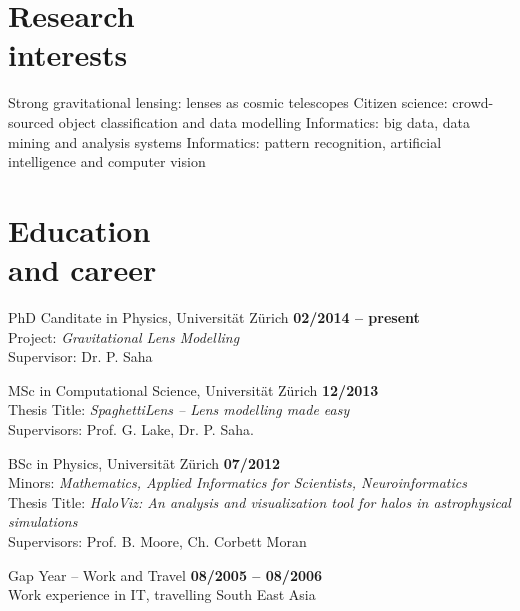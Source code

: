 \documentclass[margin,line]{resume}
\def\tb{\textbullet\;}
\begin{document}
\begin{resume}
\section{\mysidestyle Research\\interests}

  \tb Strong gravitational lensing: lenses as cosmic telescopes
  \tb Citizen science: crowd-sourced object classification and data modelling
  \tb Informatics: big data, data mining and analysis systems
  \tb Informatics: pattern recognition, artificial intelligence and computer vision


\section{\mysidestyle Education\\ and career}

\begin{list2}

  \item  PhD Canditate in Physics, Universität Zürich
  \hfill {\bf 02/2014 -- present}\\
  {\small Project: \emph{Gravitational Lens Modelling}\\
  Supervisor: Dr. P. Saha}

  \item MSc in Computational Science, Universität Zürich
  \hfill {\bf 12/2013}\\
  {\small Thesis Title: \emph{SpaghettiLens -- Lens modelling made easy} \\
  Supervisors: Prof. G. Lake, Dr. P. Saha}.

  \item BSc in Physics, Universität Zürich
  \hfill {\bf 07/2012}\\
  {\small Minors: \emph{Mathematics, Applied Informatics for Scientists, Neuroinformatics}\\
  Thesis Title: \emph{HaloViz: An analysis and visualization tool for halos in astrophysical simulations} \\
  Supervisors: Prof. B. Moore, Ch. Corbett Moran}

  \item Gap Year -- Work and Travel
  \hfill {\bf 08/2005 -- 08/2006}\\
  {\small Work experience in IT, travelling South East Asia}



\end{list2}
\end{resume}
\end{document}
